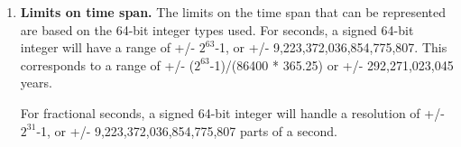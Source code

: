 
\begin{enumerate}

\item {\bf Limits on time span.} The limits on the time span that can be
represented are based on the 64-bit integer types used.  For
seconds, a signed 64-bit integer will have a range of +/- $2^{63}$-1, or
+/- 9,223,372,036,854,775,807.  This corresponds to a range of
+/- ($2^{63}$-1)/(86400 * 365.25) or +/- 292,271,023,045 years.

For fractional seconds, a signed 64-bit integer will handle a resolution of
+/- $2^{31}$-1, or +/- 9,223,372,036,854,775,807 parts of a second.

\end{enumerate}
